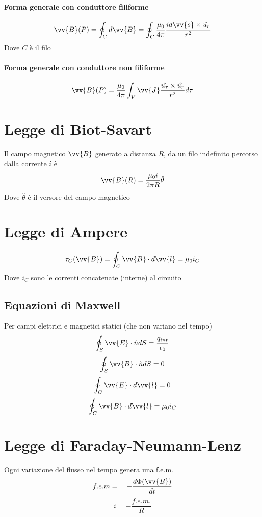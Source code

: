 \documentclass[a4paper]{report}
\begin{document}
  \paragraph{Forma generale con conduttore filiforme}
  $$ \vv{B}(P) = \oint_C d\vv{B} = \oint_C \frac{\mu_0}{4\pi} \frac{id\vv{s} \times \hat{u_r}}{r^2}$$
  Dove $C$ è il filo
  \paragraph{Forma generale con conduttore non filiforme}
  $$ \vv{B}(P) = \frac{\mu_0}{4\pi} \int_V \vv{J}\frac{\hat{u_\tau} \times \hat{u_r}}{r^2} d\tau $$

  \section{Legge di Biot-Savart}
  Il campo magnetico $\vv{B}$ generato a distanza $R$, da un filo indefinito percorso dalla corrente $i$ è
  $$ \vv{B}(R) = \frac{\mu_0 i}{2 \pi R} \hat{\theta} $$
  Dove $\hat{\theta}$ è il versore del campo magnetico

  \section{Legge di Ampere}
  $$ \tau_C (\vv{B}) = \oint_C \vv{B} \cdot d\vv{l} = \mu_0 i_C $$
  Dove $i_C$ sono le correnti concatenate (interne) al circuito

  \subsection{Equazioni di Maxwell}
  Per campi elettrici e magnetici statici (che non variano nel tempo)
  $$ \oint_S \vv{E}\cdot \hat{n} dS = \frac{q_{int}}{\epsilon_0} $$
  $$ \oint_S \vv{B}\cdot \hat{n} dS = 0 $$
  $$ \oint_C \vv{E}\cdot d\vv{l} = 0 $$
  $$ \oint_C \vv{B} \cdot d\vv{l} = \mu_0 i_C $$

  \section{Legge di Faraday-Neumann-Lenz}
  Ogni variazione del flusso nel tempo genera una f.e.m.
  $$f.e.m = \quad -\frac{d\Phi(\vv{B})}{dt} $$
  $$ i = -\frac{f.e.m.}{R} $$
\end{document}
